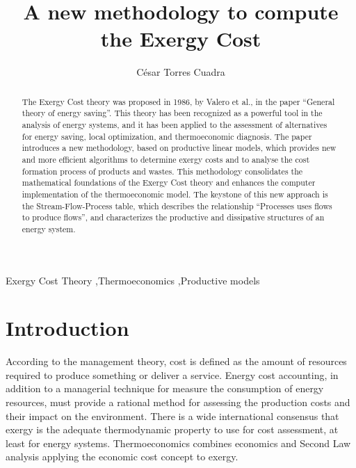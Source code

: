 \documentclass[preprint,12pt,times]{elsarticle}
\begin{document}
\begin{frontmatter}


\title{A new methodology to compute the Exergy Cost}

\author{C\'esar Torres Cuadra}

\address{University of Zaragoza, Spain}

\begin{abstract}
The Exergy Cost theory was proposed in 1986,  by Valero et al., in the paper “General theory of energy saving”. This theory has been recognized as a powerful tool in the analysis of energy systems, and it has been applied to the assessment of alternatives for energy saving, local optimization, and thermoeconomic diagnosis.
The paper introduces a new methodology, based on productive linear models, which provides new and more efficient algorithms to determine exergy costs and to analyse the cost formation process of products and wastes. This methodology consolidates the mathematical foundations of the Exergy Cost theory and enhances the computer implementation of the thermoeconomic model.
The keystone of this new approach is the Stream-Flow-Process table, which describes the relationship “Processes uses flows to produce flows”, and characterizes the productive and dissipative structures of an energy system. 
\end{abstract}

\begin{keyword}
Exergy Cost Theory \sep Thermoeconomics \sep Productive models
\end{keyword}

\end{frontmatter}

\section{Introduction}
\label{S:1}
According to the management theory, cost is defined as the amount of resources required to produce something or deliver a service. Energy cost accounting, in addition to a managerial technique for measure the consumption of energy resources, must provide a rational method for assessing the production costs and their impact on the environment.
There is a wide international consensus that exergy is the adequate thermodynamic property to use for cost assessment, at least for energy systems. Thermoeconomics combines economics and Second Law analysis applying the economic cost concept to exergy.
\end{document}
